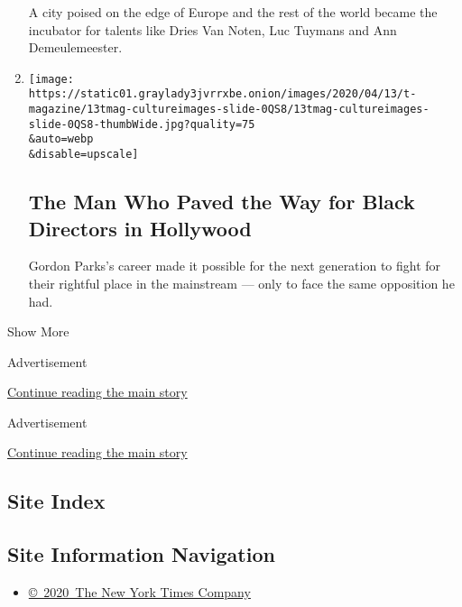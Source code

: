 \begin{enumerate}
  A city poised on the edge of Europe and the rest of the world became
  the incubator for talents like Dries Van Noten, Luc Tuymans and Ann
  Demeulemeester.
\item
  \href{/interactive/2020/04/13/t-magazine/gordon-parks.html}{}

  \texttt{[image: https://static01.graylady3jvrrxbe.onion/images/2020/04/13/t-magazine/13tmag-cultureimages-slide-0QS8/13tmag-cultureimages-slide-0QS8-thumbWide.jpg?quality=75\\\&auto=webp\\\&disable=upscale]}

  \hypertarget{the-man-who-paved-the-way-for-black-directors-in-hollywood}{%
  \subsection{The Man Who Paved the Way for Black Directors in
  Hollywood}\label{the-man-who-paved-the-way-for-black-directors-in-hollywood}}

  Gordon Parks's career made it possible for the next generation to
  fight for their rightful place in the mainstream --- only to face the
  same opposition he had.
\end{enumerate}

Show More

Advertisement

\protect\hyperlink{after-mid2}{Continue reading the main story}

Advertisement

\protect\hyperlink{after-mktg}{Continue reading the main story}

\hypertarget{site-index}{%
\subsection{Site Index}\label{site-index}}

\hypertarget{site-information-navigation}{%
\subsection{Site Information
Navigation}\label{site-information-navigation}}

\begin{itemize}
\tightlist
\item
  \href{https://help.nytimes3xbfgragh.onion/hc/en-us/articles/115014792127-Copyright-notice}{©~2020~The
  New York Times Company}
\end{itemize}

